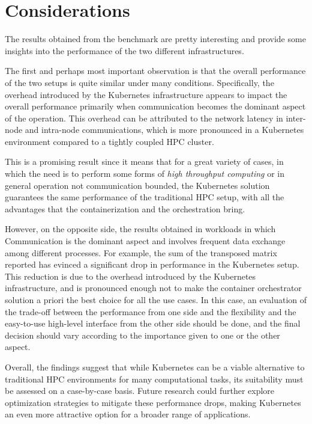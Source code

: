 \section{Considerations}

The results obtained from the benchmark are pretty interesting and provide some
insights into the performance of the two different infrastructures.

The first and perhaps most important observation is that the overall performance
of the two setups is quite similar under many conditions.
Specifically, the overhead introduced by the Kubernetes infrastructure appears
to impact the overall performance primarily when communication becomes the
dominant aspect of the operation.
This overhead can be attributed to the network latency in inter-node and
intra-node communications, which is more pronounced in a Kubernetes environment
compared to a tightly coupled HPC cluster.

This is a promising result since it means that for a great variety of cases, in
which the need is to perform some forms of \textit{high throughput computing} or
in general operation not communication bounded, the Kubernetes solution
guarantees the same performance of the traditional HPC setup, with all the
advantages that the containerization and the orchestration bring.

However, on the opposite side, the results obtained in workloads in which
Communication is the dominant aspect and involves frequent data exchange among
different processes.
For example, the sum of the transposed matrix reported has evinced a significant
drop in performance in the Kubernetes setup.
This reduction is due to the overhead introduced by the Kubernetes
infrastructure, and is pronounced enough not to make the container orchestrator
solution a priori the best choice for all the use cases.
In this case, an evaluation of the trade-off between the performance from one
side and the flexibility and the easy-to-use high-level interface from the other
side should be done, and the final decision should vary according to the
importance given to one or the other aspect.

Overall, the findings suggest that while Kubernetes can be a viable alternative
to traditional HPC environments for many computational tasks, its suitability
must be assessed on a case-by-case basis.
Future research could further explore optimization strategies to mitigate these
performance drops, making Kubernetes an even more attractive option for a
broader range of applications.
